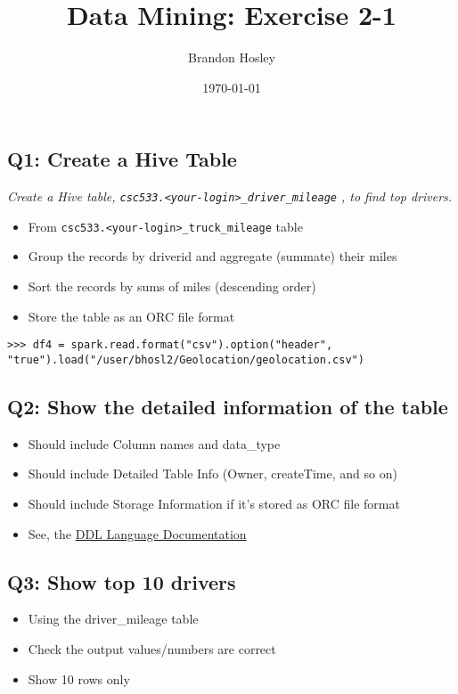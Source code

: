 \documentclass[]{article}
\title{Data Mining: Exercise 2-1}
\author{Brandon Hosley}
\date{\today}
\begin{document}
\maketitle

\vspace{3em}

\subsection*{Q1: Create a Hive Table}
\emph{Create a Hive table, 
	\texttt{csc533.<your-login>_driver_mileage}
	, to find top drivers.} \\
	\begin{itemize}[before=\itshape,font=\normalfont]
		\item From \texttt{csc533.<your-login>_truck_mileage} table
		\item Group the records by driverid and aggregate (summate) their miles
		\item Sort the records by sums of miles (descending order)
		\item Store the table as an ORC file format
	\end{itemize} 

\begin{verbatim}
>>> df4 = spark.read.format("csv").option("header", "true").load("/user/bhosl2/Geolocation/geolocation.csv")
\end{verbatim}

\subsection*{Q2: Show the detailed information of the table}
\begin{itemize}[before=\itshape,font=\normalfont]
	\item Should include Column names and data\_type
	\item Should include Detailed Table Info (Owner, createTime, and so on)
	\item Should include Storage Information if it’s stored as ORC file format
	\item See, the \href{https://cwiki.apache.org/confluence/display/Hive/LanguageManual+DDL#LanguageMan
		ualDDL-DescribeTable/View/MaterializedView/Column}{DDL Language Documentation}
\end{itemize} 
 
\subsection*{Q3: Show top 10 drivers}
\begin{itemize}[before=\itshape,font=\normalfont]
	\item Using the driver\_mileage table
	\item Check the output values/numbers are correct
	\item Show 10 rows only
\end{itemize} 
\end{document}
